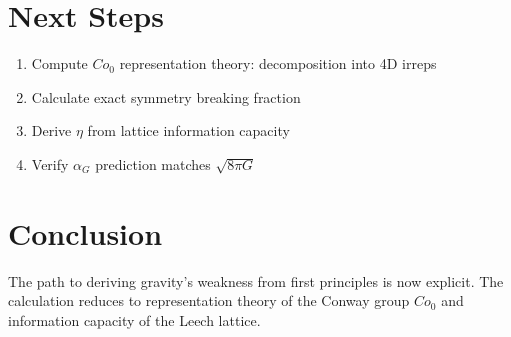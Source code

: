 \documentclass[11pt]{article}
\begin{document}
\section{Next Steps}

\begin{enumerate}
\item Compute $Co_0$ representation theory: decomposition into 4D irreps
\item Calculate exact symmetry breaking fraction
\item Derive $\eta$ from lattice information capacity
\item Verify $\alpha_G$ prediction matches $\sqrt{8\pi G}$
\end{enumerate}

\section{Conclusion}

The path to deriving gravity's weakness from first principles is now explicit.
The calculation reduces to representation theory of the Conway group $Co_0$
and information capacity of the Leech lattice.
\end{document}
